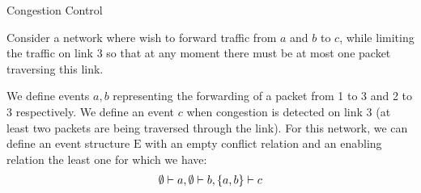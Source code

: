 \begin{frame}{Congestion Control}
    \begin{center}
    \end{center}
    Consider a network where wish to forward traffic from $a$ and $b$ to $c$, while limiting the traffic on link 3 so that
    at any moment there must be at most one packet traversing this link.
\end{frame}

\begin{frame}
    \begin{center}
    \end{center}
    We define events $a,b$ representing the forwarding of a packet from
    1 to 3 and 2 to 3 respectively.
    We define an event $c$ when congestion is detected on link 3 (at least two packets are being traversed through the link).
    For this network, we can define an event structure $\mathrm{E}$
    with an empty conflict relation and an enabling relation the least
    one for which we have:
    \begin{align*}
        \emptyset \vdash a, \emptyset \vdash b, \{a,b\} \vdash c
    \end{align*}
\end{frame}

